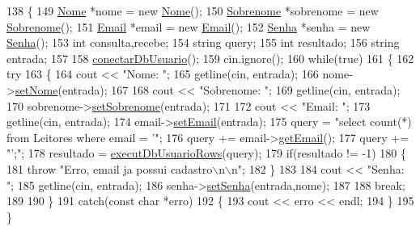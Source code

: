 \begin{DoxyCode}
138 \{
149   \mbox{\hyperlink{class_nome}{Nome}} *nome = \textcolor{keyword}{new} \mbox{\hyperlink{class_nome}{Nome}}();
150   \mbox{\hyperlink{class_sobrenome}{Sobrenome}} *sobrenome = \textcolor{keyword}{new} \mbox{\hyperlink{class_sobrenome}{Sobrenome}}();
151   \mbox{\hyperlink{class_email}{Email}} *email = \textcolor{keyword}{new} \mbox{\hyperlink{class_email}{Email}}();
152   \mbox{\hyperlink{class_senha}{Senha}} *senha = \textcolor{keyword}{new} \mbox{\hyperlink{class_senha}{Senha}}();
153   \textcolor{keywordtype}{int} consulta,recebe;
154   \textcolor{keywordtype}{string} query;
155   \textcolor{keywordtype}{int} resultado;
156   \textcolor{keywordtype}{string} entrada;
157 
158   \mbox{\hyperlink{comando_sql_8cpp_a4f89ddcbc4cf8f2587d89f72f8c7900d}{conectarDbUsuario}}();
159   cin.ignore();
160   \textcolor{keywordflow}{while}(\textcolor{keyword}{true})
161   \{
162     \textcolor{keywordflow}{try}
163     \{
164       cout << \textcolor{stringliteral}{"Nome: "};
165       getline(cin, entrada);
166       nome->\mbox{\hyperlink{class_nome_a83b9f56ec9f86f4b976846f4c5c65b30}{setNome}}(entrada);
167 
168       cout << \textcolor{stringliteral}{"Sobrenome: "};
169       getline(cin, entrada);
170       sobrenome->\mbox{\hyperlink{class_sobrenome_a9dc2277e3600656838e47c86dfddd23a}{setSobrenome}}(entrada);
171 
172       cout << \textcolor{stringliteral}{"Email: "};
173       getline(cin, entrada);
174       email->\mbox{\hyperlink{class_email_a2614b3a19d961411d1bece9c1bdf616f}{setEmail}}(entrada);
175       query = \textcolor{stringliteral}{"select count(*) from Leitores where email = '"};
176       query += email->\mbox{\hyperlink{class_email_aa9a0e1a66b4efde65cf017bdd1c6c625}{getEmail}}();
177       query += \textcolor{stringliteral}{"';"};
178       resultado = \mbox{\hyperlink{comando_sql_8cpp_af54952694f2fa7d76f969fb74b853cb9}{executDbUsuarioRows}}(query);
179       \textcolor{keywordflow}{if}(resultado != -1)
180       \{
181         \textcolor{keywordflow}{throw} \textcolor{stringliteral}{"Erro, email ja possui cadastro\(\backslash\)n\(\backslash\)n"};
182       \}
183 
184       cout << \textcolor{stringliteral}{"Senha: "};
185       getline(cin, entrada);
186       senha->\mbox{\hyperlink{class_senha_a01bbc2a82c5f405b68f33fe0dc538ec1}{setSenha}}(entrada,nome);
187 
188       \textcolor{keywordflow}{break};
189 
190     \}
191     \textcolor{keywordflow}{catch}(\textcolor{keyword}{const} \textcolor{keywordtype}{char} *erro)
192     \{
193       cout << erro << endl;
194     \}
195   \}

\end{DoxyCode}
